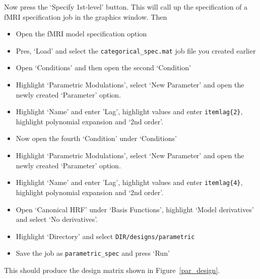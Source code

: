 \documentclass[a4paper,titlepage]{book}
\newcommand{\bi}{\begin{itemize}}
\newcommand{\ei}{\end{itemize}}
\begin{document}
Now press the `Specify 1st-level' button. This will call up the specification of a fMRI specification job in the graphics window. Then
\bi
\item{Open the fMRI model specification option}
\item{Pres, `Load' and select the \verb!categorical_spec.mat! job file you created earlier}
\item{Open `Conditions' and then open the second `Condition'}
\item{Highlight `Parametric Modulations', select `New Parameter' and open the newly created `Parameter' option.}
\item{Highlight `Name' and enter 'Lag', highlight values and enter \verb!itemlag{2}!, highlight polynomial expansion and `2nd order'.}
\item{Now open the fourth `Condition' under `Conditions'}
\item{Highlight `Parametric Modulations', select `New Parameter' and open the newly created `Parameter' option.}
\item{Highlight `Name' and enter 'Lag', highlight values and enter \verb!itemlag{4}!, highlight polynomial expansion and `2nd order'.}
\item{Open `Canonical HRF' under `Basis Functions', highlight `Model derivatives' and select 
`No derivatives'.}
\item{Highlight `Directory' and select \verb!DIR/designs/parametric!}
\item{Save the job as \verb!parametric_spec! and press `Run'}
\ei
This should produce the design matrix shown in Figure~\ref{par_design}.
\end{document}

